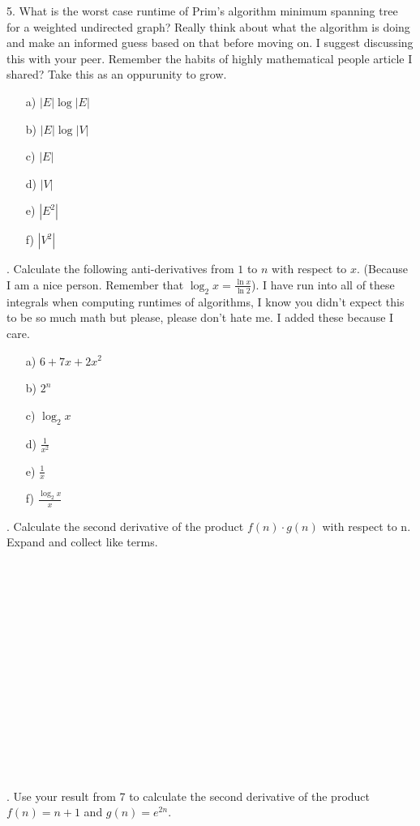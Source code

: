 \documentclass[12pt]{article}
\begin{document}
5. What is the worst case runtime of Prim's algorithm minimum spanning tree for a weighted undirected graph? Really think about what the algorithm is doing and make an informed
guess based on that before moving on. I suggest discussing this with your peer. Remember the habits of highly mathematical
people article I shared? Take this as an oppurunity to grow.
\begin{enumerate}
    \item[a)]$|E|\log{|E|}$
    \item[b)]$|E|\log{|V|}$
    \item[c)]$|E|$
    \item[d)]$|V|$
    \item[e)]$|E^2|$
    \item[f)]$|V^2|$
\end{enumerate}
\newpage
{}. Calculate the following anti-derivatives from $1$ to $n$ with respect to $x$. (Because I am a nice person. Remember that $\log_2{x}=\frac{\ln{x}}{\ln{2}}$). I have run into all of these integrals when computing runtimes of algorithms, I know you didn't expect this to be so much math but please, please don't hate me. I added these because I care.
\begin{enumerate}
    \item[a)]$6+7x+2x^2$
    \item[b)]$2^n$
    \item[c)]$\log_{2}{x}$
    \item[d)]$\frac{1}{x^2}$
    \item[e)]$\frac{1}{x}$
    \item[f)]$\frac{\log_{2}{x}}{x}$
\end{enumerate}
\newpage
{}. Calculate the second derivative of the product $f(n) \cdot g(n)$ with respect to n. Expand and collect like terms.\\\\\\\\\\\\\\\\\\\\\\\\\\\\\\\\
. Use your result from 7 to calculate the second derivative of the product $f(n) = n + 1$ and $g(n)=e^{2n}$.\\\\\\\\\\\\\\\\\\\\\\\\
\end{document}
